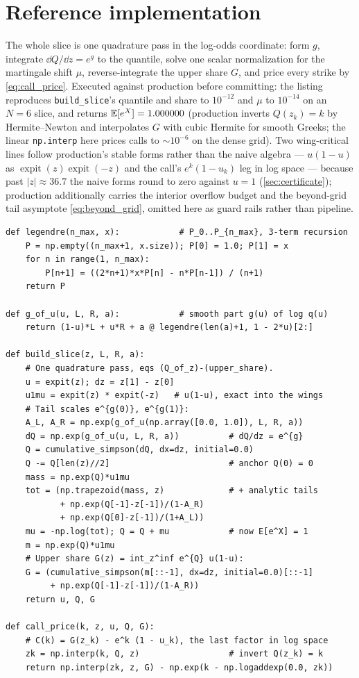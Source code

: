 \documentclass[11pt]{article}
\begin{document}
\section{Reference implementation}
\label{app:ref}

The whole slice is one quadrature pass in the log-odds coordinate: form $g$,
integrate $\dd Q/\dd z=e^{g}$ to the quantile, solve one scalar
normalization for the martingale shift $\mu$, reverse-integrate the upper
share $G$, and price every strike by \eqref{eq:call_price}.  Executed
against production before committing: the listing reproduces
\texttt{build\_slice}'s quantile and share to $10^{-12}$ and $\mu$ to
$10^{-14}$ on an $N=6$ slice, and returns $\mathbb{E}[e^{X}]=1.000000$ (production
inverts $Q(z_k)=k$ by Hermite--Newton and interpolates $G$ with cubic
Hermite for smooth Greeks; the linear \texttt{np.interp} here prices calls
to $\sim10^{-6}$ on the dense grid).  Two wing-critical lines follow
production's stable forms rather than the naive algebra --- $u(1-u)$ as
$\operatorname{expit}(z)\operatorname{expit}(-z)$ and the call's
$e^{k}(1-u_k)$ leg in log space --- because past $|z|\approx36.7$ the naive
forms round to zero against $u=1$ (\cref{sec:certificate}); production
additionally carries the interior overflow budget and the beyond-grid tail
asymptote \eqref{eq:beyond_grid}, omitted here as guard rails rather than
pipeline.

\begin{lstlisting}[caption={The LQD quadrature pipeline (distilled from
\texttt{models/lqd/\{basis,quadrature\}.py}).}]
def legendre(n_max, x):            # P_0..P_{n_max}, 3-term recursion
    P = np.empty((n_max+1, x.size)); P[0] = 1.0; P[1] = x
    for n in range(1, n_max):
        P[n+1] = ((2*n+1)*x*P[n] - n*P[n-1]) / (n+1)
    return P

def g_of_u(u, L, R, a):            # smooth part g(u) of log q(u)
    return (1-u)*L + u*R + a @ legendre(len(a)+1, 1 - 2*u)[2:]

def build_slice(z, L, R, a):
    # One quadrature pass, eqs (Q_of_z)-(upper_share).
    u = expit(z); dz = z[1] - z[0]
    u1mu = expit(z) * expit(-z)   # u(1-u), exact into the wings
    # Tail scales e^{g(0)}, e^{g(1)}:
    A_L, A_R = np.exp(g_of_u(np.array([0.0, 1.0]), L, R, a))
    dQ = np.exp(g_of_u(u, L, R, a))          # dQ/dz = e^{g}
    Q = cumulative_simpson(dQ, dx=dz, initial=0.0)
    Q -= Q[len(z)//2]                        # anchor Q(0) = 0
    mass = np.exp(Q)*u1mu
    tot = (np.trapezoid(mass, z)             # + analytic tails
           + np.exp(Q[-1]-z[-1])/(1-A_R)
           + np.exp(Q[0]-z[-1])/(1+A_L))
    mu = -np.log(tot); Q = Q + mu            # now E[e^X] = 1
    m = np.exp(Q)*u1mu
    # Upper share G(z) = int_z^inf e^{Q} u(1-u):
    G = (cumulative_simpson(m[::-1], dx=dz, initial=0.0)[::-1]
         + np.exp(Q[-1]-z[-1])/(1-A_R))
    return u, Q, G

def call_price(k, z, u, Q, G):
    # C(k) = G(z_k) - e^k (1 - u_k), the last factor in log space
    zk = np.interp(k, Q, z)                  # invert Q(z_k) = k
    return np.interp(zk, z, G) - np.exp(k - np.logaddexp(0.0, zk))
\end{lstlisting}
\end{document}
